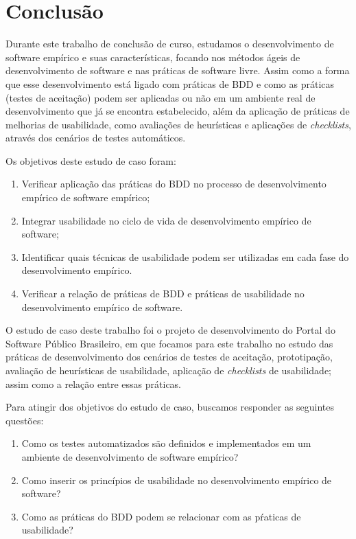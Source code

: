 \chapter{Conclusão}
\label{consideracoes-finais}

Durante este trabalho de conclusão de curso, estudamos o desenvolvimento de software empírico e suas características, focando nos métodos ágeis de desenvolvimento de software e nas práticas de software livre. Assim como a forma que esse desenvolvimento está ligado com práticas de BDD e como as práticas (testes de aceitação) podem ser aplicadas ou não em um ambiente real de desenvolvimento que já se encontra estabelecido, além da aplicação de práticas de melhorias de usabilidade, como avaliações de heurísticas e aplicações de \textit{checklists}, através dos cenários de testes automáticos.

Os objetivos deste estudo de caso foram:
\begin{enumerate}
\item Verificar aplicação das práticas do BDD no processo de desenvolvimento empírico de software empírico;
\item Integrar usabilidade no ciclo de vida de desenvolvimento empírico de software;
\item Identificar quais técnicas de usabilidade  podem ser utilizadas em cada fase do desenvolvimento empírico.
\item Verificar a relação de práticas de BDD e práticas de usabilidade no desenvolvimento empírico de software.
\end{enumerate}

O estudo de caso deste trabalho foi o projeto de desenvolvimento do Portal do Software Público Brasileiro, em que focamos para este trabalho no estudo das práticas de desenvolvimento dos cenários de testes de aceitação, prototipação, avaliação de heurísticas de usabilidade, aplicação de \textit{checklists} de usabilidade; assim como a relação entre essas práticas.

Para atingir dos objetivos do estudo de caso, buscamos responder as seguintes questões:
\begin{enumerate}
\item Como os testes automatizados são definidos e implementados em um ambiente de desenvolvimento de software empírico?
\item Como inserir os princípios de usabilidade no desenvolvimento empírico de software?
\item Como as práticas do BDD podem se relacionar com as pŕaticas de usabilidade?
\end{enumerate}

